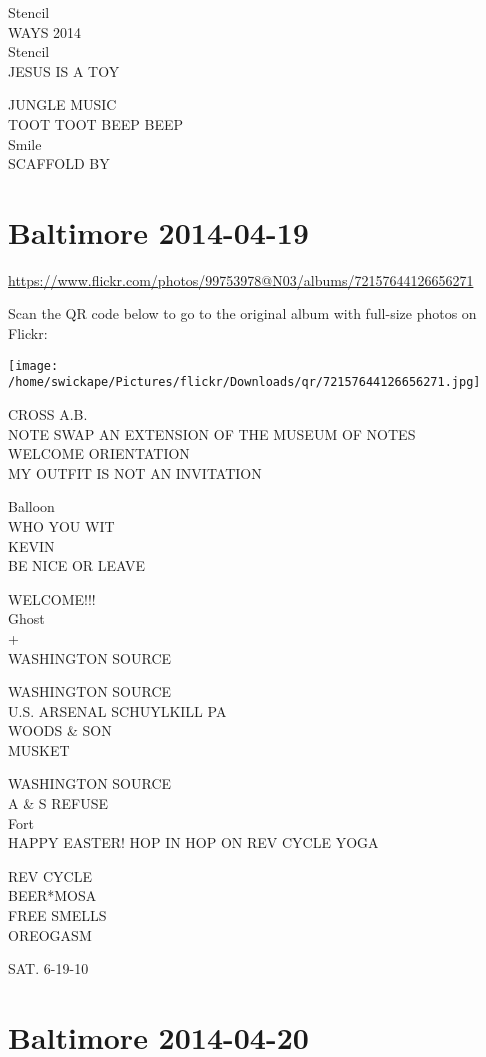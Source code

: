 \documentclass[10pt,letterpaper]{article}
\begin{document}
Stencil\\
WAYS 2014\\
Stencil\\
JESUS IS A TOY

JUNGLE MUSIC\\
TOOT TOOT BEEP BEEP\\
Smile\\
SCAFFOLD BY


\section*{Baltimore 2014-04-19}

\url{https://www.flickr.com/photos/99753978@N03/albums/72157644126656271}

Scan the QR code below to go to the original album with full-size photos on Flickr:

\texttt{[image: /home/swickape/Pictures/flickr/Downloads/qr/72157644126656271.jpg]}


CROSS A.B.\\
NOTE SWAP AN EXTENSION OF THE MUSEUM OF NOTES\\
WELCOME ORIENTATION\\
MY OUTFIT IS NOT AN INVITATION

Balloon\\
WHO YOU WIT\\
KEVIN\\
BE NICE OR LEAVE

WELCOME!!!\\
Ghost\\
+\\
WASHINGTON SOURCE

WASHINGTON SOURCE\\
U.S. ARSENAL SCHUYLKILL PA\\
WOODS \& SON\\
MUSKET

WASHINGTON SOURCE\\
A \& S REFUSE\\
Fort\\
HAPPY EASTER! HOP IN HOP ON REV CYCLE YOGA

REV CYCLE\\
BEER*MOSA\\
FREE SMELLS\\
OREOGASM

SAT. 6{-}19{-}10


\section*{Baltimore 2014-04-20}
\end{document}
